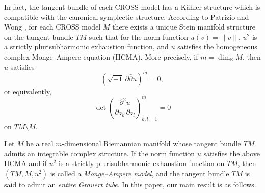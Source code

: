\documentclass[a4paper, 12pt]{article}
\newcommand{\bR}{\mathbb{R}}
\newcommand{\bCP}{\mathbb{CP}^n}
\begin{document}


In fact, the tangent bundle of each CROSS model has a K\"ahler structure which is compatible with the canonical symplectic structure. According to Patrizio and Wong \cite{PW91}, for each CROSS model $M$ there exists a unique Stein manifold structure on the tangent bundle $TM$ such that for the norm function $u(v) = \|v\|$, $u^2$ is a strictly plurisubharmonic exhaustion function, and $u$ satisfies the homogeneous complex Monge--Ampere equation (HCMA). More precisely, if $m = \dim_\bR M$, then $u$
satisfies
\[
(\sqrt{-1}\,\partial\bar\partial u)^m = 0,
\]
or equivalently,
\[
\det\!\left(
\frac{\partial^2 u}{\partial z_k\,\partial \bar z_l}
\right)_{k,l=1}^{m} = 0
\]
on $TM \setminus M$.




Let $M$ be a real $m$-dimensional Riemannian manifold whose tangent bundle $TM$ admits an integrable complex structure. If the norm function $u$ satisfies the above HCMA and if $u^2$ is a strictly plurisubharmonic exhaustion function on $TM$, then $(TM,M,u^2)$ is called a \emph{Monge--Ampere model}, and the tangent bundle $TM$ is said to admit an \emph{entire Grauert tube}. In this paper, our main result is as follows.
\end{document}
